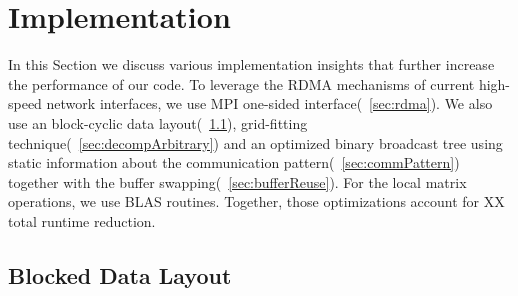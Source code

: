 \documentclass[sigplan,review,anonymous]{acmart}\settopmatter{printfolios=true,printccs=false,printacmref=false}
\begin{document}
\section{Implementation}
\label{sec:implementation}
In this Section we discuss various implementation insights that further 
increase the performance of our code. To leverage the RDMA mechanisms of 
current high-speed network interfaces, we use MPI one-sided 
interface(~\cref{sec:rdma}). We also use an block-cyclic data 
layout(~\cref{sec:datalayout}), grid-fitting 
technique(~\cref{sec:decompArbitrary}) and an optimized binary broadcast 
tree using static information about
the communication pattern(~\cref{sec:commPattern}) together with the buffer 
swapping(~\cref{sec:bufferReuse}). For the local matrix operations, we use 
BLAS routines. Together, those optimizations account 
for XX total runtime 
reduction. 

\subsection{Blocked Data Layout}
\label{sec:datalayout}
\end{document}

